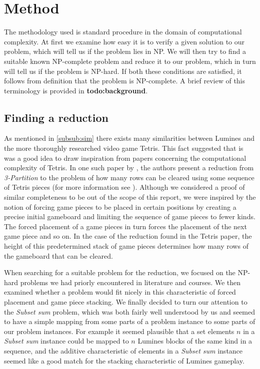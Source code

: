 \section{Method}
\label{method}

The methodology used is standard procedure in the domain of computational complexity. At first we examine how easy it is to verify a given solution to our problem, which will tell us if the problem lies in NP. We will then try to find a suitable known NP-complete problem and reduce it to our problem, which in turn will tell us if the problem is NP-hard. If both these conditions are satisfied, it follows from definition that the problem is NP-complete. A brief review of this terminology is provided in \textbf{todo:background}.

\subsection{Finding a reduction}
As mentioned in \ref{subsub:sim} there exists many similarities between Lumines and the more thoroughly researched video game Tetris. This fact suggested that is was a good idea to draw inspiration from papers concerning the computational complexity of Tetris. In one such paper by \citeauthor{tetris}, the authors present a reduction from \textit{3-Partition} to the problem of how many rows can be cleared using some sequence of Tetris pieces (for more information see \cite{tetris}). Although we considered a proof of similar completeness to be out of the scope of this report, we were inspired by the notion of forcing game pieces to be placed in certain positions by creating a precise initial gameboard and limiting the sequence of game pieces to fewer kinds. The forced placement of a game pieces in turn forces the placement of the next game piece and so on. In the case of the reduction found in the Tetris paper, the height of this predetermined stack of game pieces determines how many rows of the gameboard that can be cleared.

When searching for a suitable problem for the reduction, we focused on the NP-hard problems we had priorly encountered in literature and courses. We then examined whether a problem would fit nicely in this characteristic of forced placement and game piece stacking. We finally decided to turn our attention to the \textit{Subset sum} problem, which was both fairly well understood by us and seemed to have a simple mapping from some parts of a problem instance to some parts of our problem instances. For example it seemed plausible that a set elements $n$ in a \textit{Subset sum} instance could be mapped to $n$ Lumines blocks of the same kind in a sequence, and the additive characteristic of elements in a \textit{Subset sum} instance seemed like a good match for the stacking characteristic of Lumines gameplay.
